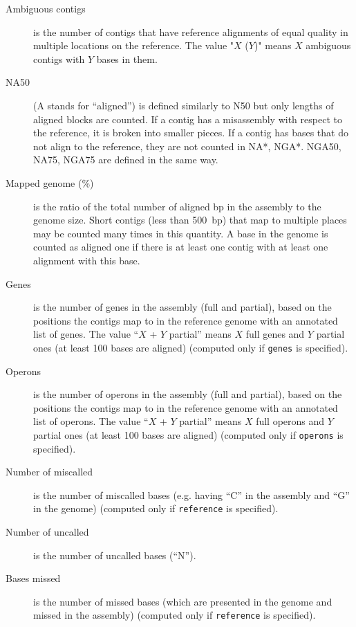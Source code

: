 \documentclass{article}
\begin{document}
\begin{description}
\item[Ambiguous contigs] is the number of contigs that have reference alignments
of equal quality in multiple locations on the reference.
The value "$X$ ($Y$)" means $X$ ambiguous contigs with $Y$ bases in them.

\item[NA50] (A stands for ``aligned'') is 
defined similarly to N50 but only
lengths of aligned blocks are counted.
If a contig has a misassembly with respect to the reference, it is broken into smaller pieces.
If a contig has bases that do not align to the reference, they are not counted
in NA*, NGA*. NGA50, NA75, NGA75 are defined in the same way.

\item[Mapped genome (\%)] is the ratio of the total number of aligned bp in the assembly
to the genome size.  Short contigs (less than 500~bp) that map to multiple
places may be counted many times in this quantity.  A base in the genome is
counted as aligned one if there is at least one contig with at least one
alignment with this base.

\item[Genes] is the number of genes in the assembly (full and partial), based
on the positions the contigs map to in the reference genome with an annotated
list of genes. The value ``$X$ + $Y$ partial'' means $X$ full genes and $Y$ partial ones
(at least 100 bases are aligned)  (computed only if {\tt genes} is specified).

\item[Operons] is the number of operons in the assembly (full and partial),
based on the positions the contigs map to in the reference genome with an annotated list of operons.
The value ``$X$ + $Y$ partial'' means $X$ full operons and $Y$ partial ones (at least 100 bases are aligned) (computed only if {\tt operons} is specified).

\item[Number of miscalled] is the number of miscalled bases (e.g. having ``C'' in the assembly and ``G'' in the genome)  (computed only if {\tt reference} is specified).

\item[Number of uncalled] is the number of uncalled bases (``N'').

\item[Bases missed] is the number of missed bases (which are presented in the genome and missed in the assembly) (computed only if {\tt reference} is specified).

\end{description}
\end{document}
